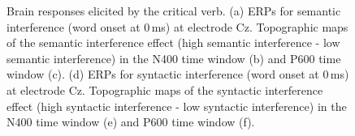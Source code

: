 \documentclass[a4paper, man, floatsintext]{apa7}
\begin{document}
\begin{figure}[H]
\caption{Brain responses elicited by the critical verb. (a) ERPs for semantic interference (word onset at 0\,ms) at electrode Cz. Topographic maps of the semantic interference effect (high semantic interference - low semantic interference) in the N400 time window (b) and P600 time window (c). (d) ERPs for syntactic interference  (word onset at 0\,ms) at electrode Cz. Topographic maps of the syntactic interference effect (high syntactic interference - low syntactic interference) in the N400 time window (e) and P600 time window (f).}
    \label{fig:erp_sem_syn}
\begin{minipage}{.74\linewidth}
\centering
{}
\end{minipage}%
\begin{minipage}{.25\linewidth}
\centering
{}

\end{minipage}
\end{figure}
\end{document}
